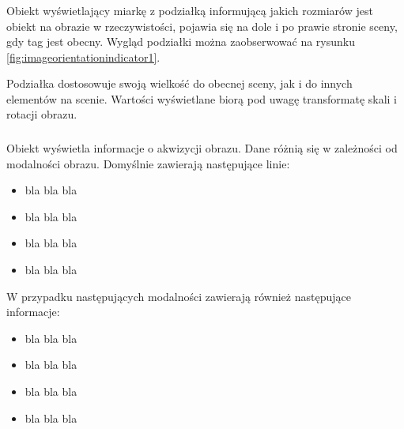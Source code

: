 \subsubsection{}

Obiekt wyświetlający miarkę z podziałką informującą jakich rozmiarów jest obiekt na obrazie w rzeczywistości, pojawia się na dole i po prawie stronie sceny, gdy tag  jest obecny.
Wygląd podziałki można zaobserwować na rysunku \ref{fig:imageorientationindicator1}.

Podziałka dostosowuje swoją wielkość do obecnej sceny, jak i do innych elementów na scenie.
Wartości wyświetlane biorą pod uwagę transformatę skali i rotacji obrazu.

\subsubsection{}

Obiekt wyświetla informacje o akwizycji obrazu.
Dane różnią się w zależności od modalności obrazu.
Domyślnie zawierają następujące linie:
\begin{itemize}
    \item bla bla bla
    \item bla bla bla
    \item bla bla bla
    \item bla bla bla
\end{itemize}

W przypadku następujących modalności zawierają również następujące informacje:
\begin{itemize}
    \item bla bla bla
    \item bla bla bla
    \item bla bla bla
    \item bla bla bla
\end{itemize}